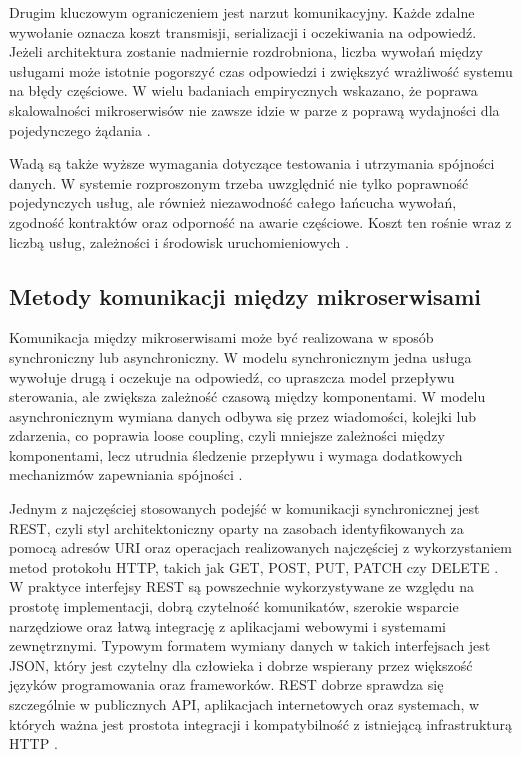 Drugim kluczowym ograniczeniem jest narzut komunikacyjny. Każde zdalne wywołanie oznacza koszt transmisji, serializacji i oczekiwania na odpowiedź. Jeżeli architektura zostanie nadmiernie rozdrobniona, liczba wywołań między usługami może istotnie pogorszyć czas odpowiedzi i zwiększyć wrażliwość systemu na błędy częściowe. W wielu badaniach empirycznych wskazano, że poprawa skalowalności mikroserwisów nie zawsze idzie w parze z poprawą wydajności dla pojedynczego żądania \cite{francesco2019architecting}.

Wadą są także wyższe wymagania dotyczące testowania i utrzymania spójności danych. W systemie rozproszonym trzeba uwzględnić nie tylko poprawność pojedynczych usług, ale również niezawodność całego łańcucha wywołań, zgodność kontraktów oraz odporność na awarie częściowe. Koszt ten rośnie wraz z liczbą usług, zależności i środowisk uruchomieniowych \cite{microservicesTesting2025}.

\subsection{Metody komunikacji między mikroserwisami}
\label{subsec:microservices-communication}

Komunikacja między mikroserwisami może być realizowana w sposób synchroniczny lub asynchroniczny. W modelu synchronicznym jedna usługa wywołuje drugą i oczekuje na odpowiedź, co upraszcza model przepływu sterowania, ale zwiększa zależność czasową między komponentami. W modelu asynchronicznym wymiana danych odbywa się przez wiadomości, kolejki lub zdarzenia, co poprawia loose coupling, czyli mniejsze zależności między komponentami, lecz utrudnia śledzenie przepływu i wymaga dodatkowych mechanizmów zapewniania spójności \cite{inproceedingsYelpaze}.

Jednym z najczęściej stosowanych podejść w komunikacji synchronicznej jest REST, czyli styl architektoniczny oparty na zasobach identyfikowanych za pomocą adresów URI oraz operacjach realizowanych najczęściej z wykorzystaniem metod protokołu HTTP, takich jak GET, POST, PUT, PATCH czy DELETE \cite{fielding2000rest,rfc9110http}. W praktyce interfejsy REST są powszechnie wykorzystywane ze względu na prostotę implementacji, dobrą czytelność komunikatów, szerokie wsparcie narzędziowe oraz łatwą integrację z aplikacjami webowymi i systemami zewnętrznymi. Typowym formatem wymiany danych w takich interfejsach jest JSON, który jest czytelny dla człowieka i dobrze wspierany przez większość języków programowania oraz frameworków. REST dobrze sprawdza się szczególnie w publicznych API, aplikacjach internetowych oraz systemach, w których ważna jest prostota integracji i kompatybilność z istniejącą infrastrukturą HTTP \cite{openapi2025spec}.

